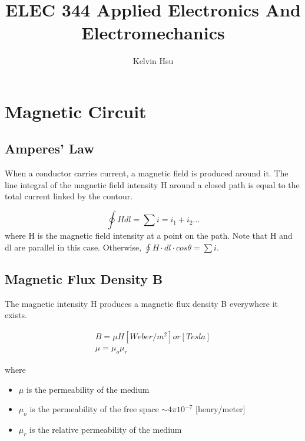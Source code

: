 \documentclass{article}
\title{ELEC 344 Applied Electronics And Electromechanics}
\author{Kelvin Hsu}
\begin{document}
    \sffamily
   	\maketitle
    \newpage

    \section*{Magnetic Circuit}

    \subsection*{Amperes' Law}
    When a conductor carries current, a magnetic field is produced around it. The line integral 
    of the magnetic field intensity H around a closed path is equal to the total current linked by the contour.
    
        \begin{equation*}
            \oint H dl = \sum{i} = i_{1} + i_{2}...
        \end{equation*}
    where H is the magnetic field intensity at a point on the path. Note that H and dl are 
    parallel in this case. Otherwise, $\oint H\cdot dl\cdot cos\theta= \sum{i}$.\par

    \subsection*{Magnetic Flux Density B}
    The magnetic intensity H produces a magnetic flux density B everywhere it exists. 

    \begin{align*}
        B = \mu H[Weber/m^{2}] or [Tesla]\\
        \mu = \mu_{o} \mu_{r}
    \end{align*}

    where

    \begin{itemize}
        \item $\mu$ is the permeability of the medium
        \item $\mu_{o}$ is the permeability of the free space $\sim 4\pi 10^{-7}$ [henry/meter]
        \item $\mu_{r}$ is the relative permeability of the medium
    \end{itemize}
\end{document}
